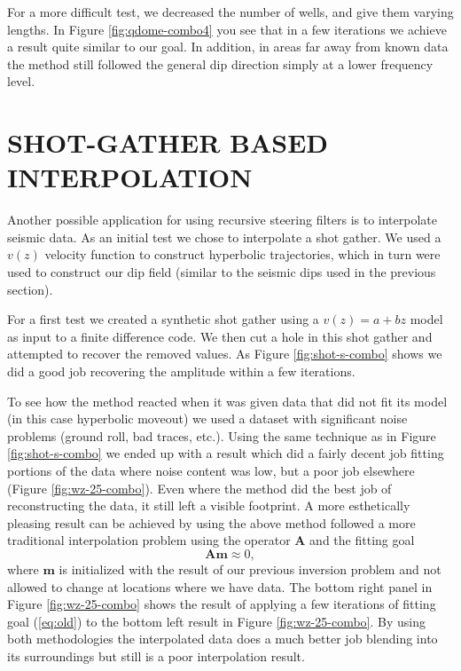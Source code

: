 
\par
For a more difficult test, we decreased the number of wells, and give
them varying lengths.
In Figure \ref{fig:qdome-combo4} you see that in a few iterations
we  achieve a result quite similar
to our goal. In addition, in areas far away from known data the method
still followed the general dip direction simply at a lower frequency level.



\section{SHOT-GATHER BASED INTERPOLATION}

Another possible application for using recursive
steering filters is to interpolate
seismic data.  As an initial test 
we chose to interpolate 
a shot gather.  We used a $v(z)$ velocity function to construct
hyperbolic trajectories, which in turn were used to
construct our dip
field (similar to the seismic dips used in the previous section).
\par
For a first test
we created a synthetic shot gather using a $v(z)=a+bz$ model as input
to a finite difference code.  We then cut
a hole in this shot gather  and attempted
to recover the removed values.
As Figure \ref{fig:shot-s-combo} shows we did a good job 
recovering the amplitude within a few iterations.

\par
To see how the method reacted when it was given data that did not
fit its model (in this case hyperbolic moveout) we used a dataset with
significant noise problems (ground roll, bad traces, etc.).  Using
the same technique as in Figure \ref{fig:shot-s-combo} 
we ended up with a result which did a fairly
decent job fitting portions of the data where noise content was low,
but a poor job elsewhere (Figure \ref{fig:wz-25-combo}).  Even  where
the method did the best job of reconstructing the data, it still left
a visible footprint. A more esthetically pleasing result can be achieved
by using the above method followed a more traditional interpolation problem
using  the operator $\mathbf A$ and the fitting goal
\begin{equation}
\mathbf A \mathbf m \approx 0 ,
\label{eq:old}
\end{equation}
where  $\mathbf m$ is initialized with the result of our previous 
inversion problem and not allowed to change at locations where we have data.
The bottom right panel in Figure \ref{fig:wz-25-combo}  shows
the result of applying a few iterations of fitting goal (\ref{eq:old}) 
to the bottom left result in Figure \ref{fig:wz-25-combo}.
By using  both methodologies the interpolated data does a much better job 
blending into its
surroundings but still is a poor interpolation result.


